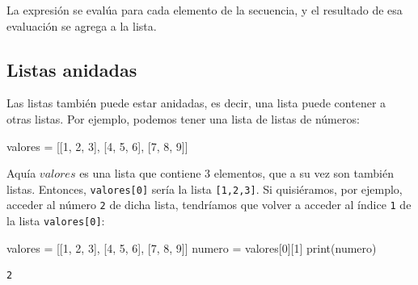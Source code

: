 \documentclass[
  letterpaper,
  DIV=11,
  numbers=noendperiod]{scrreprt}
\newenvironment{Shaded}{\begin{snugshade}}{\end{snugshade}}
\newcommand{\BuiltInTok}[1]{\textcolor[rgb]{0.00,0.23,0.31}{#1}}
\newcommand{\DecValTok}[1]{\textcolor[rgb]{0.68,0.00,0.00}{#1}}
\newcommand{\NormalTok}[1]{\textcolor[rgb]{0.00,0.23,0.31}{#1}}
\newcommand{\OperatorTok}[1]{\textcolor[rgb]{0.37,0.37,0.37}{#1}}
\begin{document}
La expresión se evalúa para cada elemento de la secuencia, y el
resultado de esa evaluación se agrega a la lista.

\subsection{Listas anidadas}\label{listas-anidadas}

Las listas también puede estar anidadas, es decir, una lista puede
contener a otras listas. Por ejemplo, podemos tener una lista de listas
de números:

\begin{Shaded}
\begin{Highlighting}[]
\NormalTok{valores }\OperatorTok{=}\NormalTok{ [[}\DecValTok{1}\NormalTok{, }\DecValTok{2}\NormalTok{, }\DecValTok{3}\NormalTok{], [}\DecValTok{4}\NormalTok{, }\DecValTok{5}\NormalTok{, }\DecValTok{6}\NormalTok{], [}\DecValTok{7}\NormalTok{, }\DecValTok{8}\NormalTok{, }\DecValTok{9}\NormalTok{]]}
\end{Highlighting}
\end{Shaded}

Aquía \(valores\) es una lista que contiene 3 elementos, que a su vez
son también listas. Entonces, \texttt{valores{[}0{]}} sería la lista
\texttt{{[}1,2,3{]}}. Si quisiéramos, por ejemplo, acceder al número
\texttt{2} de dicha lista, tendríamos que volver a acceder al índice
\texttt{1} de la lista \texttt{valores{[}0{]}}:

\begin{Shaded}
\begin{Highlighting}[]
\NormalTok{valores }\OperatorTok{=}\NormalTok{ [[}\DecValTok{1}\NormalTok{, }\DecValTok{2}\NormalTok{, }\DecValTok{3}\NormalTok{], [}\DecValTok{4}\NormalTok{, }\DecValTok{5}\NormalTok{, }\DecValTok{6}\NormalTok{], [}\DecValTok{7}\NormalTok{, }\DecValTok{8}\NormalTok{, }\DecValTok{9}\NormalTok{]]}
\NormalTok{numero }\OperatorTok{=}\NormalTok{ valores[}\DecValTok{0}\NormalTok{][}\DecValTok{1}\NormalTok{]}
\BuiltInTok{print}\NormalTok{(numero)}
\end{Highlighting}
\end{Shaded}

\begin{verbatim}
2
\end{verbatim}
\end{document}
